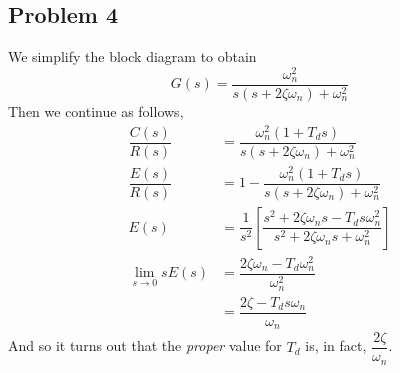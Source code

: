 \documentclass[letterpaper,10pt]{article}
\begin{document}
\subsection*{Problem 4}
We simplify the block diagram to obtain
\[G(s) = \dfrac{\omega_{n}^{2}}{s(s+2\zeta\omega_{n})+\omega_{n}^{2}}\]
Then we continue as follows,
\begin{align*}
	\dfrac{C(s)}{R(s)} &= \dfrac{\omega_{n}^{2}(1+T_{d}s)}{s(s+2\zeta\omega_{n})+\omega_{n}^{2}} \\
	\dfrac{E(s)}{R(s)} &= 1 - \dfrac{\omega_{n}^{2}(1+T_{d}s)}{s(s+2\zeta\omega_{n})+\omega_{n}^{2}} \\
	E(s) &= \dfrac{1}{s^2} \left[ \dfrac{s^2+2\zeta\omega_{n}s-T_{d}s\omega_{n}^{2}}{s^2+2\zeta\omega_{n}s+\omega_{n}^{2}} \right] \\
	\lim_{s\to0}sE(s) &= \dfrac{2\zeta\omega_{n}-T_{d}\omega_{n}^{2}}{\omega_{n}^{2}} \\
	&= \dfrac{2\zeta-T_{d}s\omega_{n}}{\omega_{n}}
\end{align*}
And so it turns out that the \emph{proper} value for $T_{d}$ is, in fact, $\dfrac{2\zeta}{\omega_{n}}$.
\end{document}

